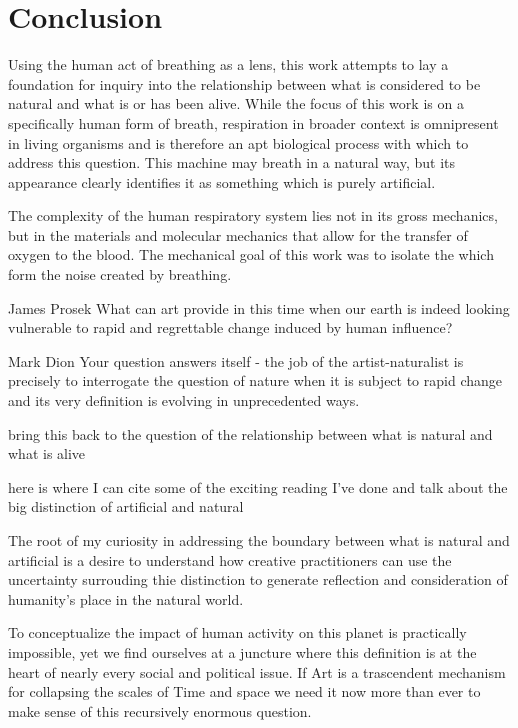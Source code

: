 \documentclass[letterpaper]{article}
\begin{document}
\section{Conclusion}

Using the human act of breathing as a lens, this work attempts to lay a foundation for inquiry into the relationship between what is considered to be natural and what is or has been alive. While the focus of this work is on a specifically human form of breath, respiration in broader context is omnipresent in living organisms and is therefore an apt biological process with which to address this question. This machine may breath in a natural way, but its appearance clearly identifies it as something which is purely artificial.



The complexity of the human respiratory system lies not in its gross mechanics, but in the materials and molecular mechanics that allow for the transfer of oxygen to the blood. The mechanical goal of this work was to isolate the  which form the noise created by breathing.  

James Prosek
What can art provide in this time when our earth is indeed looking vulnerable to rapid and regrettable change induced by human influence?

Mark Dion
Your question answers itself - the job of the artist-naturalist is precisely to interrogate the question of nature when it is subject to rapid change and its very definition is evolving in unprecedented ways.





bring this back to the question of the relationship between what is natural and what is alive

here is where I can cite some of the exciting reading I've done and talk about the big distinction of artificial and natural


The root of my curiosity in addressing the boundary between what is natural and artificial is a desire to understand how creative practitioners can use the uncertainty surrouding thie distinction to generate reflection and consideration of humanity's place in the natural world. 

To conceptualize the impact of human activity on this planet is practically impossible, yet we find ourselves at a juncture where this definition is at the heart of nearly every social and political issue. If Art is a trascendent mechanism for collapsing the scales of Time and space we need it now more than ever to make sense of this recursively enormous question.
\end{document}
